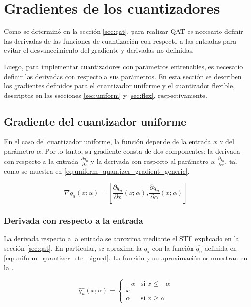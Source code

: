 \section{Gradientes de los cuantizadores}
\label{sec:gradientes}

Como se determinó en la sección \ref{sec:qat}, para realizar QAT es necesario definir las derivadas de las funciones de cuantización con respecto a las entradas para evitar el desvanecimiento del gradiente y derivadas no definidas.

Luego, para implementar cuantizadores con parámetros entrenables, es necesario definir las derivadas con respecto a sus parámetros. En esta sección se describen los gradientes definidos para el cuantizador uniforme y el cuantizador flexible, descriptos en las secciones \ref{sec:uniform} y \ref{sec:flex}, respectivamente.

\subsection{Gradiente del cuantizador uniforme}
\label{sec:uniform_quantizer_gradient}

En el caso del cuantizador uniforme, la función depende de la entrada $x$ y del parámetro $\alpha$. Por lo tanto, su gradiente consta de dos componentes: la derivada con respecto a la entrada $\frac{\partial q_u}{\partial x}$ y la derivada con respecto al parámetro $\alpha$ $\frac{\partial q_u}{\partial \alpha}$, tal como se muestra en \eqref{eq:uniform_quantizer_gradient_generic}.

\begin{equation}
    \label{eq:uniform_quantizer_gradient_generic}
    \nabla q_u\left(x; \alpha\right) =
    \left[
    \frac{\partial q_u}{\partial x}\left(x; \alpha\right),
    \frac{\partial q_u}{\partial \alpha}\left(x; \alpha\right)
    \right]
\end{equation}

\subsubsection{Derivada con respecto a la entrada}
La derivada respecto a la entrada se aproxima mediante el STE explicado en la sección \ref{sec:qat}. En particular, se aproxima la $q_u$ con la función $\hat{q_u}$ definida en \eqref{eq:uniform_quantizer_ste_signed}. La función y su aproximación se muestran en la .

\begin{equation}
    \label{eq:uniform_quantizer_ste_signed}
    \hat{q_u}\left(x; \alpha\right) =
    \begin{cases}
        - \alpha & \text{si $x \leq -\alpha$} \\
        x \\
        \alpha & \text{si $x \geq \alpha$}
    \end{cases}
\end{equation}

